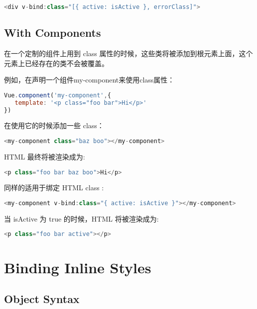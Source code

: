 \begin{lstlisting}[language=JavaScript]
<div v-bind:class="[{ active: isActive }, errorClass]">
\end{lstlisting}




\subsection{With Components}

在一个定制的组件上用到 class 属性的时候，这些类将被添加到根元素上面，这个元素上已经存在的类不会被覆盖。

例如，在声明一个组件my-component来使用class属性：

\begin{lstlisting}[language=JavaScript]
Vue.component('my-component',{
   template: '<p class="foo bar">Hi</p>'
})
\end{lstlisting}

在使用它的时候添加一些 class：

\begin{lstlisting}[language=JavaScript]
<my-component class="baz boo"></my-component>
\end{lstlisting}

HTML 最终将被渲染成为:


\begin{lstlisting}[language=JavaScript]
<p class="foo bar baz boo">Hi</p>
\end{lstlisting}

同样的适用于绑定 HTML class :

\begin{lstlisting}[language=JavaScript]
<my-component v-bind:class="{ active: isActive }"></my-component>
\end{lstlisting}

当 isActive 为 true 的时候，HTML 将被渲染成为:


\begin{lstlisting}[language=JavaScript]
<p class="foo bar active"></p>
\end{lstlisting}








\section{Binding Inline Styles}



\subsection{Object Syntax}

